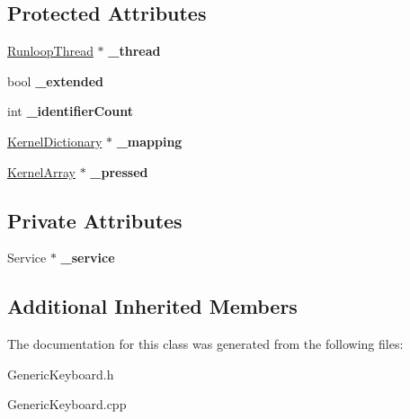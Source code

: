 \subsection*{Protected Attributes}
\begin{DoxyCompactItemize}
\item 
\mbox{\label{class_generic_keyboard_a54f18808154a1af2babca5cab64320f9}} 
\hyperlink{class_runloop_thread}{Runloop\+Thread} $\ast$ {\bfseries \+\_\+thread}
\item 
\mbox{\label{class_generic_keyboard_a98b6e081427bfbf72c03ef16aee7fcbe}} 
bool {\bfseries \+\_\+extended}
\item 
\mbox{\label{class_generic_keyboard_a901addff4150beed15747fd01905dd7b}} 
int {\bfseries \+\_\+identifier\+Count}
\item 
\mbox{\label{class_generic_keyboard_ad2d2ce165de1352b0670620338decb94}} 
\hyperlink{class_kernel_dictionary}{Kernel\+Dictionary} $\ast$ {\bfseries \+\_\+mapping}
\item 
\mbox{\label{class_generic_keyboard_aecfcfc8513bb18181a56b4b984cba113}} 
\hyperlink{class_kernel_array}{Kernel\+Array} $\ast$ {\bfseries \+\_\+pressed}
\end{DoxyCompactItemize}
\subsection*{Private Attributes}
\begin{DoxyCompactItemize}
\item 
\mbox{\label{class_generic_keyboard_abb8543e658be6686e2f2b46a8340e557}} 
Service $\ast$ {\bfseries \+\_\+service}
\end{DoxyCompactItemize}
\subsection*{Additional Inherited Members}


The documentation for this class was generated from the following files\+:\begin{DoxyCompactItemize}
\item 
Generic\+Keyboard.\+h\item 
Generic\+Keyboard.\+cpp\end{DoxyCompactItemize}
